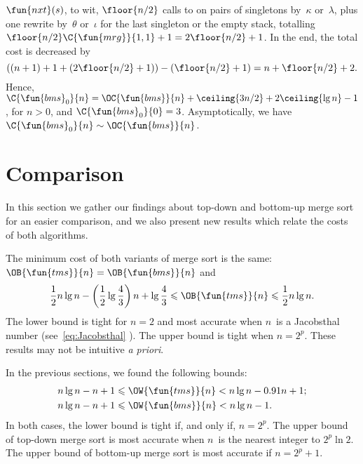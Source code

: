 \(\fun{nxt}(s)\), to wit, \(\floor{n/2}\) calls
to  on pairs of singletons
by~\(\kappa\) or~\(\lambda\), plus one rewrite by~\(\theta\)
or~\(\iota\) for the last singleton or the empty stack, totalling
\(\floor{n/2}\C{\fun{mrg}}{1,1} + 1 = 2\floor{n/2} + 1\). In the end,
the total cost is decreased by
\begin{equation*}
  ((n+1) + 1 + (2\floor{n/2}+1)) - (\floor{n/2}+1) = n + \floor{n/2} +
  2.
\end{equation*}
Hence, \(\C{\fun{bms}_0}{n} = \OC{\fun{bms}}{n} + \ceiling{3n/2} +
2\ceiling{\lg n} - 1\), for \(n>0\), and \(\C{\fun{bms}_0}{0} =
3\). Asymptotically, we have \(\C{\fun{bms}_0}{n} \sim
\OC{\fun{bms}}{n}\).


\section{Comparison}

In this section we gather our findings about top\hyp{}down and
bottom\hyp{}up merge sort for an easier comparison, and we also
present new results which relate the costs of both algorithms.


The minimum cost of both variants of merge sort is the same:
\(\OB{\fun{tms}}{n} = \OB{\fun{bms}}{n}\) and
\begin{equation*}
\frac{1}{2}n\lg n - \left(\frac{1}{2}\lg\frac{4}{3}\right)n + \lg\frac{4}{3}
\leqslant \OB{\fun{tms}}{n} \leqslant \frac{1}{2}n\lg n.
\end{equation*}
The lower bound is tight for \(n=2\) and most accurate when \(n\)~is a
Jacobsthal number (see~\eqref{eq:Jacobsthal}
). The upper bound is tight when
\(n=2^p\). These results may not be intuitive \emph{a priori}.


\hspace*{-8.7pt} In the previous sections, we found the following bounds:
\begin{align*}
n\lg n - n + 1 &\leqslant \OW{\fun{tms}}{n} <
n\lg n - 0.91 n + 1;\\
n\lg n - n + 1 &\leqslant \OW{\fun{bms}}{n} < n\lg n - 1.
\end{align*}
In both cases, the lower bound is tight if, and only if, \(n=2^p\).
The upper bound of top\hyp{}down merge sort is most accurate when
\(n\)~is the nearest integer to \(2^p\ln 2\). The upper bound of
bottom\hyp{}up merge sort is most accurate if \(n=2^p+1\).

